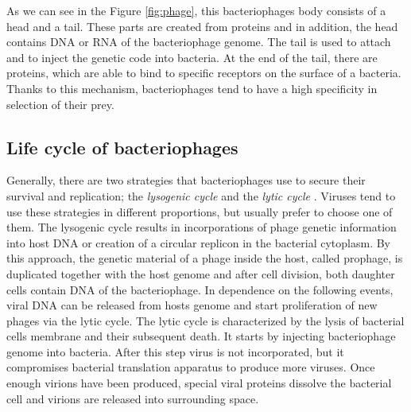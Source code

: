 As we can see in the Figure \ref{fig:phage}, this bacteriophages body consists of a head and a tail.
These parts are created from proteins and in addition, the head contains DNA or RNA of the bacteriophage genome.
The tail is used to attach and to inject the genetic code into bacteria.
At the end of the tail, there are proteins, which are able to bind to specific receptors on the surface of a bacteria.
Thanks to this mechanism, bacteriophages tend to have a high specificity in selection of their prey.

\subsection{Life cycle of bacteriophages}
Generally, there are two strategies that bacteriophages use to secure their survival and replication; the \emph{lysogenic cycle} and the \emph{lytic cycle} \cite{}.
Viruses tend to use these strategies in different proportions, but usually prefer to choose one of them.
The lysogenic cycle results in incorporations of phage genetic information into host DNA or creation of a circular replicon in the bacterial cytoplasm.
By this approach, the genetic material of a phage inside the host, called prophage, is duplicated together with the host genome and after cell division, both daughter cells contain DNA of the bacteriophage.
In dependence on the following events, viral DNA can be released from hosts genome and start proliferation of new phages via the lytic cycle.
The lytic cycle is characterized by the lysis of bacterial cells membrane and their subsequent death.
It starts by injecting bacteriophage genome into bacteria.
After this step virus is not incorporated, but it compromises bacterial translation apparatus to produce more viruses.
Once enough virions have been produced, special viral proteins dissolve the bacterial cell and virions are released into surrounding space.

